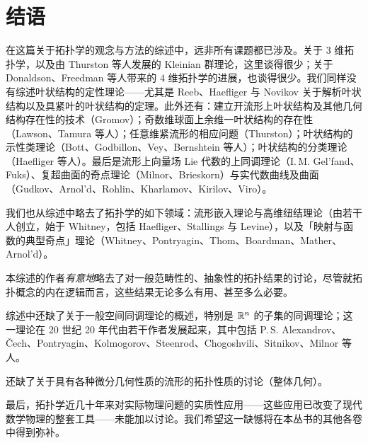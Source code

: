 \chapter*{结语}

在这篇关于拓扑学的观念与方法的综述中，远非所有课题都已涉及。关于 $3$ 维拓扑学，以及由 Thurston 等人发展的 Kleinian 群理论，这里谈得很少；关于 Donaldson、Freedman 等人带来的 $4$ 维拓扑学的进展，也谈得很少。我们同样没有综述叶状结构的定性理论——尤其是 Reeb、Haefliger 与 Novikov 关于解析叶状结构以及具紧叶的叶状结构的定理。此外还有：建立开流形上叶状结构及其他几何结构存在性的技术（Gromov）；奇数维球面上余维一叶状结构的存在性（Lawson、Tamura 等人）；任意维紧流形的相应问题（Thurston）；叶状结构的示性类理论（Bott、Godbillon、Vey、Bernshtein 等人）；叶状结构的分类理论（Haefliger 等人）。最后是流形上向量场 Lie 代数的上同调理论（I.\,M. Gel'fand、Fuks）、复超曲面的奇点理论（Milnor、Brieskorn）与实代数曲线及曲面（Gudkov、Arnol'd、Rohlin、Kharlamov、Kirilov、Viro）。

我们也从综述中略去了拓扑学的如下领域：流形嵌入理论与高维纽结理论（由若干人创立，始于 Whitney，包括 Haefliger、Stallings 与 Levine），以及「映射与函数的典型奇点」理论（Whitney、Pontryagin、Thom、Boardman、Mather、Arnol'd）。

本综述的作者\emph{有意地}略去了对一般范畴性的、抽象性的拓扑结果的讨论，尽管就拓扑概念的内在逻辑而言，这些结果无论多么有用、甚至多么必要。

综述中还缺了关于一般空间同调理论的概述，特别是 $\mathbb{R}^n$ 的子集的同调理论；这一理论在 20 世纪 20 年代由若干作者发展起来，其中包括 P.\,S. Alexandrov、Čech、Pontryagin、Kolmogorov、Steenrod、Chogoshvili、Sitnikov、Milnor 等人。

还缺了关于具有各种微分几何性质的流形的拓扑性质的讨论（整体几何）。

最后，拓扑学近几十年来对实际物理问题的实质性应用——这些应用已改变了现代数学物理的整套工具——未能加以讨论。我们希望这一缺憾将在本丛书的其他各卷中得到弥补。



